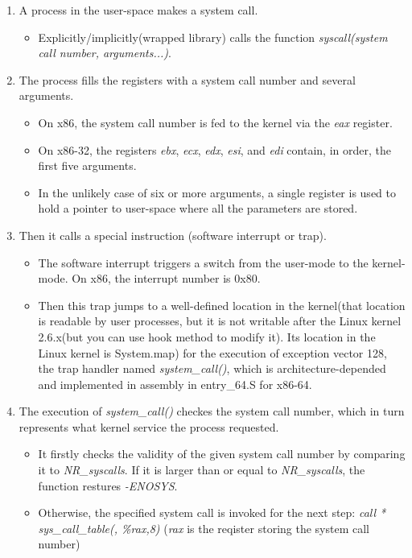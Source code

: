 \documentclass[letterpaper,10pt]{article}
\begin{document}
\begin{enumerate}
	\item A process in the user-space makes a system call.
	\begin{itemize}
		\item Explicitly/implicitly(wrapped library) calls the function \textit{syscall(system call number, arguments...)}.
	\end{itemize}
	\item The process fills the registers with a system call number and several arguments.
	\begin{itemize}
		\item On x86, the system call number is fed to the kernel via the \textit{eax} register.
		\item On x86-32, the registers \textit{ebx}, \textit{ecx}, \textit{edx}, \textit{esi}, and \textit{edi} contain, in order, the first five arguments. 
		\item In the unlikely case of six or more arguments, a single register is used to hold a pointer to user-space where all the parameters are stored.
	\end{itemize}
	\item Then it calls a special instruction (software interrupt or trap). 
	\begin{itemize}
		\item The software interrupt triggers a switch from the user-mode to the kernel-mode. On x86, the interrupt number is 0x80. 
		\item Then this trap jumps to a well-defined location in the kernel(that location is readable by user processes, but it is not writable after the Linux kernel 2.6.x(but you can use hook method to modify it). Its location in the Linux kernel is System.map) for the execution of exception vector 128, the trap handler named \textit{system\_call()}, which is architecture-depended and implemented in assembly in entry\_64.S for x86-64.
	\end{itemize}
	\item The execution of \textit{system\_call()} checkes the system call number, which in turn represents what kernel service the process requested.
	\begin{itemize}
		\item It firstly checks the validity of the given system call number by comparing it to \textit{NR\_syscalls}. If it is larger than or equal to \textit{NR\_syscalls}, the function restures \textit{-ENOSYS}. 
		\item Otherwise, the specified system call is invoked for the next step: \textit{call * sys\_call\_table(, \%rax,8)} (\textit{rax} is the reqister storing the system call number)

\end{itemize}
\end{enumerate}
\end{document}
